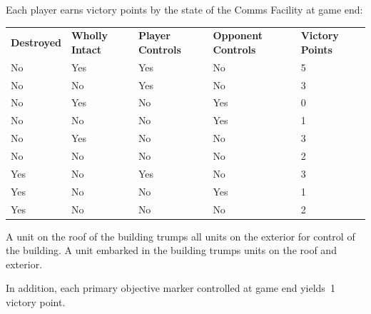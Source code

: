 \begin{scoring}  
\begin{primaries}

  Each player earns victory points by the state of the Comms Facility
  at game end:

\begin{center}  
  \begin{tabular}{C{1in}C{1in}C{1in}C{1in}C{1in}}
 {\color{white}\bf Destroyed} & {\color{white}\bf Wholly Intact} & {\color{white}\bf Player Controls} & {\color{white}\bf Opponent Controls} & {\color{white}\bf Victory Points}\\
No & Yes & Yes & No  & 5\\
 No & No  & Yes & No  & 3\\
No & Yes & No  & Yes & 0\\
 No & No  & No  & Yes & 1\\
No & Yes & No  & No  & 3\\
 No & No  & No  & No  & 2\\
Yes & No & Yes & No  & 3\\
 Yes & No & No  & Yes & 1\\
Yes & No & No  & No  & 2\\
  \end{tabular}
\end{center}

A unit on the roof of the building trumps all units on the exterior
for control of the building.  A unit embarked in the building trumps
units on the roof and exterior.

In addition, each primary objective marker controlled at game end
yields~1 victory point.


\end{primaries}
\end{scoring}
